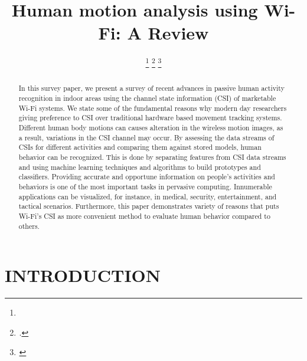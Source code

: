 \documentclass[conference]{IEEEtran}
\title{\LARGE \bf
Human motion analysis using Wi-Fi: A Review
}
\author{ %
\thanks{}%
\thanks{$^{}$. 
        {\tt\small }}%
\thanks{$^{}$
        {\tt\small }}%
}
\begin{document}
\maketitle
\thispagestyle{empty}
\pagestyle{empty}


\begin{abstract}
In this survey paper, we present a survey of recent advances in passive human activity recognition in indoor areas using the channel state information (CSI) of marketable Wi-Fi systems. We state some of the fundamental reasons why modern day researchers giving preference to CSI over traditional hardware based movement tracking systems. Different human body motions can causes alteration in the wireless motion images, as a result, variations in the CSI channel may occur. By assessing the data streams of CSIs for different activities and comparing them against stored models, human behavior can be recognized. This is done by separating features from CSI data streams and using machine learning techniques and algorithms to build prototypes and classifiers. Providing accurate and opportune information on people’s activities and behaviors is one of the most important tasks in pervasive computing. Innumerable applications can be visualized, for instance, in medical, security, entertainment, and tactical scenarios. Furthermore, this paper demonstrates variety of reasons that puts Wi-Fi’s CSI as more convenient method to evaluate human behavior compared to others. 


\end{abstract}


\section{INTRODUCTION}
\end{document}
